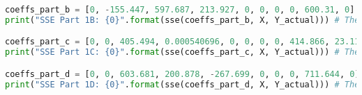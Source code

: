\documentclass[15pt,a4paper,openright]{article}
\begin{document}
\begin{lstlisting}[language=Python, caption=1e Code]
coeffs_part_b = [0, -155.447, 597.687, 213.927, 0, 0, 0, 0, 600.31, 0] # The coefficients from part (b)
print("SSE Part 1B: {0}".format(sse(coeffs_part_b, X, Y_actual))) # The SSE using  the coefficients from part (b)

coeffs_part_c = [0, 0, 405.494, 0.000540696, 0, 0, 0, 0, 414.866, 23.1162] # The coefficients from part (c)
print("SSE Part 1C: {0}".format(sse(coeffs_part_c, X, Y_actual))) # The SSE using  the coefficients from part (c)

coeffs_part_d = [0, 0, 603.681, 200.878, -267.699, 0, 0, 0, 711.644, 0] # The coefficients from part (d)
print("SSE Part 1D: {0}".format(sse(coeffs_part_d, X, Y_actual))) # The SSE using  the coefficients from part (d)


\end{lstlisting}
\end{document}
